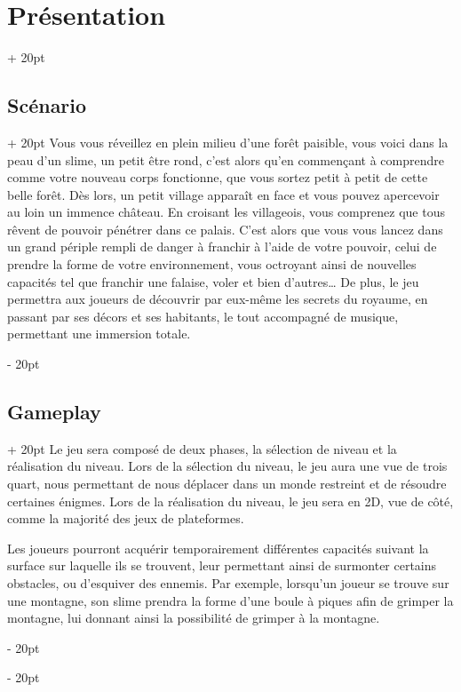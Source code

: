 \documentclass[a4paper, 12pt, twoside]{article}
\newcommand{\ind}[1][20pt]{\advance\leftskip + #1}
\newcommand{\deind}[1][20pt]{\advance\leftskip - #1}
\newenvironment{indt}[2][20pt]{#2 \par \ind[#1]}{\par \deind} %
\begin{document}

    \newpage

    \begin{indt}{\section{Présentation}}
        \begin{indt}{\subsection{Scénario}}
            Vous vous réveillez en plein milieu d'une forêt paisible, vous voici dans la peau d'un slime, un petit être rond, c'est alors qu'en commençant à comprendre comme votre nouveau corps fonctionne, que vous sortez petit à petit de cette belle forêt. Dès lors, un petit village apparaît en face et vous pouvez apercevoir au loin un immence château. En croisant les villageois, vous comprenez que tous rêvent de pouvoir pénétrer dans ce palais. C'est alors que vous vous lancez dans un grand périple rempli de danger à franchir à l'aide de votre pouvoir, celui de prendre la forme de votre environnement, vous octroyant ainsi de nouvelles capacités tel que franchir une falaise, voler et bien d'autres… De plus, le jeu permettra aux joueurs de découvrir par eux-même les secrets du royaume, en passant par ses décors et ses habitants, le tout accompagné de musique, permettant une immersion totale.
        \end{indt}
        
        \begin{indt}{\subsection{Gameplay}}
            Le jeu sera composé de deux phases, la sélection de niveau et la réalisation du niveau. Lors de la sélection du niveau, le jeu aura une vue de trois quart, nous permettant de nous déplacer dans un monde restreint et de résoudre certaines énigmes. Lors de la réalisation du niveau, le jeu sera en 2D, vue de côté, comme la majorité des jeux de plateformes.

            Les joueurs pourront acquérir temporairement différentes capacités suivant la surface sur laquelle ils se trouvent, leur permettant ainsi de surmonter certains obstacles, ou d'esquiver des ennemis. Par exemple, lorsqu'un joueur se trouve sur une montagne, son slime prendra la forme d'une boule à piques afin de grimper la montagne, lui donnant ainsi la possibilité de grimper à la montagne. 


\end{indt}
\end{indt}
\end{document}
